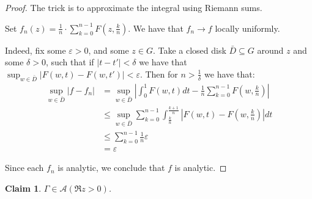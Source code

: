 \documentclass[11pt]{article} %
\newtheorem{claim}[theorem]{Claim}
\theoremstyle{definition}
\theoremstyle{remark}
\newcommand{\abs}[1]{\left|#1\right|}
\begin{document}
\begin{proof}
The trick is to approximate the integral using Riemann sums.

Set $f_n \left(z\right) = \frac{1}{n} \cdot \sum_{k=0}^{n-1} F\left(z, \frac{k}{n}\right)$. We have that $f_n \to f$ locally uniformly.

Indeed, fix some $\varepsilon > 0$, and some $z \in G$. Take a closed disk $\bar{D} \subseteq G$ around $z$ and some $\delta > 0$, such that if $\abs{t-t'} < \delta$ we have that $\sup_{w\in\bar{D}}\abs{F\left(w, t\right) - F\left(w, t'\right)} < \varepsilon$. Then for $n > \frac{1}{\delta}$ we have that:
\[
\begin{split}
\sup_{w \in \bar{D}} \abs{f - f_n} & = \sup_{w\in\bar{D}}\abs{\int_0^1 F\left(w,t\right)dt - \frac{1}{n}\sum_{k=0}^{n-1} F\left(w, \frac{k}{n}\right)} \\
& \leq \sup_{w\in\bar{D}}\sum_{k=0}^{n-1}\int_{\frac{k}{n}}^{\frac{k+1}{n}} \abs{F\left(w,t\right) - F\left(w, \frac{k}{n}\right)}dt \\
& \leq \sum_{k=0}^{n-1}\frac{1}{n}\varepsilon \\
& = \varepsilon
\end{split}
\]

Since each $f_n$ is analytic, we conclude that $f$ is analytic.
\end{proof}

\begin{claim}
$\Gamma \in \mathcal{A}\left(\Re z > 0 \right)$.
\end{claim}
\end{document}
